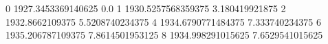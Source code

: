 0 1927.3453369140625 0.0
1 1930.5257568359375 3.180419921875
2 1932.8662109375 5.5208740234375
4 1934.6790771484375 7.333740234375
6 1935.206787109375 7.8614501953125
8 1934.998291015625 7.6529541015625
